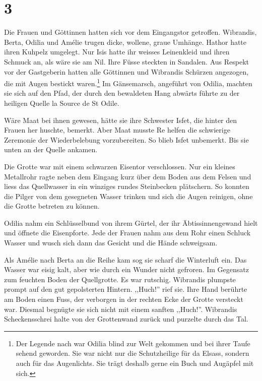 \documentclass[11pt,titlepage,a5paper]{book}
\newcommand{\am}{Amélie }
\begin{document}
\section*{3}

Die Frauen und Göttinnen hatten sich vor dem Eingangstor getroffen. Wibrandis, Berta, Odilia und \am trugen dicke, wollene, graue Umhänge. Hathor hatte ihren Kuhpelz umgelegt. Nur Isis hatte ihr weisses Leinenkleid und ihren Schmuck an, als wäre sie am Nil. Ihre Füsse steckten in Sandalen. Aus Respekt vor der Gastgeberin hatten alle Göttinnen und Wibrandis Schürzen angezogen, die mit Augen bestickt waren.\footnote{Der Legende nach war Odilia blind zur Welt gekommen und bei ihrer Taufe sehend geworden. Sie war nicht nur die Schutzheilige für da Elsass, sondern auch für das Augenlichts. Sie trägt deshalb gerne ein Buch und Augäpfel mit sich.} Im Gänsemarsch, angeführt von Odilia, machten sie sich auf den Pfad, der durch den bewaldeten Hang abwärts führte zu der heiligen Quelle la Source de St Odile.

Wäre Maat bei ihnen gewesen, hätte sie ihre Schwester Isfet, die hinter den Frauen her huschte, bemerkt. Aber Maat musste Re helfen die schwierige Zeremonie der Wiederbelebung vorzubereiten. So blieb Isfet unbemerkt. Bis sie unten an der Quelle ankamen. 

Die Grotte war mit einem schwarzen Eisentor verschlossen. Nur ein kleines Metallrohr ragte neben dem Eingang kurz über dem Boden aus dem Felsen und liess das Quellwasser in ein winziges rundes Steinbecken plätschern. So konnten die Pilger von dem gesegneten Wasser trinken und sich die Augen reinigen, ohne die Grotte betreten zu können. 

Odilia nahm ein Schlüsselbund von ihrem Gürtel, der ihr Äbtissinnengewand hielt und öffnete die Eisenpforte. Jede der Frauen nahm aus dem Rohr einen Schluck Wasser und wusch sich dann das Gesicht und die Hände schweigsam.

Als \am nach Berta an die Reihe kam sog sie scharf die Winterluft ein. Das Wasser war eisig kalt, aber wie durch ein Wunder nicht gefroren. Im Gegensatz zum feuchten Boden der Quellgrotte. Es war rutschig. Wibrandis plumpste prompt auf den gut gepolsterten Hintern. ,,Huch!'' rief sie. Ihre Hand berührte am Boden einen Fuss, der verborgen in der rechten Ecke der Grotte versteckt war. Diesmal begnügte sie sich nicht mit einem sanften ,,Huch!''. Wibrandis Scheckensschrei halte von der Grottenwand zurück und purzelte durch das Tal.
\end{document}
